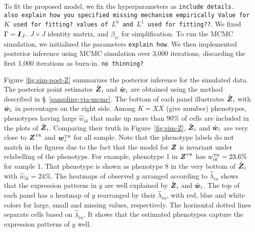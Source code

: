 \documentclass[12pt,]{article}
\def\Z{\bm{Z}}
\newcommand{\true}{{\mbox{\tiny TR}}}
\newcommand{\bZ}{\mbox{\boldmath $Z$}}
\newcommand{\bw}{\mbox{\boldmath $w$}}
\newcommand{\bI}{\mbox{\boldmath $I$}}
\begin{document}
To fit the proposed model, we fix the hyperparameters as
%
{\tt include details. also explain how you specified missing mechanism empirically Value for $K$ used for fitting? values of $L^0$ and $L^1$ used for fitting??}.
%
We fixed $\Gamma=\bI_J$. $J\times J$ identity matrix, and $\beta_{1i}$ for
simplification. To run the MCMC simulation, we initialized the parameters
%
{\tt explain how}.
%
We then implemented posterior inference using MCMC simulation
over 3,000 iterations, discarding the first 1,000 iterations as burn-in.
%
{\tt no thinning?}  
%


Figure \ref{fig:sim-post-Z} summarizes the posterior inference for the simulated data.  The posterior point estimates $\hat{\bZ}_i$ and $\hat{\bw}_i$ are obtained using the method described in \S~\ref{sampling-via-mcmc}.  
%
The bottom of each panel illustrates $\hat{\bZ}_i$ with $\hat{\bw}_i$ in percentages on the right side. Among $K=XX$ (give number) phenotypes, phenotypes having large $\hat{w}_{ik}$ that make up more than 90\% of cells are included in the plots of $\hat{\bZ}_i$.    Comparing their truth in Figure~\ref{fig:sim-Z}, $\hat{\bZ}_i$ and $\hat{\bw}_i$ are very close to $\bZ^\true$ and $\bw_i^\true$ for all sample. Note that the phenotype labels do not match in the figures due to the fact that the model for $\bZ$ is invariant under relabelling of the phenotyps. For example, phenotype 1 in $\bZ^\true$ has $w^\true_{ik}=23.6\%$ for sample 1.  That phenotype is shown as phenotype 8 in the very bottom of $\hat{\bZ}_i$ with $\hat{w}_{ik}=24\%$.   %
The heatmaps of observed $y$ arranged according to $\hat{\lambda}_{in}$ shows that the expression patterns in $y$ are well explained by $\hat{\bZ}_i$ and $\hat{\bw}_i$.  The top of each panel has a heatmap of $y$ rearranged by their $\hat{\lambda}_{in}$, with red, blue and white colors for large, small and missing values, respectively.  The horizontal dotted lines separate cells based on $\hat{\lambda}_{in}$.  It shows that the estimated phenotypes capture the expression patterns of $y$ well.    
\end{document}
